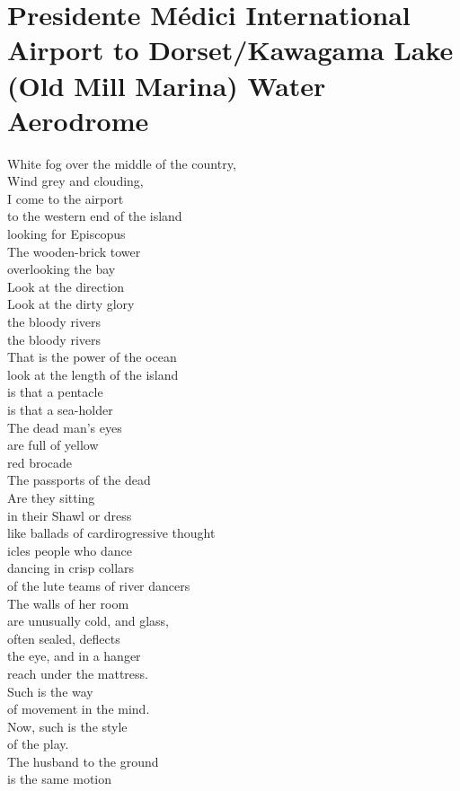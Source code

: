 \documentclass[smalldemyvopaper,11pt,twoside,onecolumn,openright,extrafontsizes]{memoir}
\begin{document}
\chapter{Presidente Médici International Airport to Dorset/Kawagama Lake (Old Mill Marina) Water Aerodrome}
White fog over the middle of the country,
\\Wind grey and clouding,
\\I come to the airport
\\to the western end of the island
\\looking for Episcopus
\\The wooden-brick tower
\\overlooking the bay
\\Look at the direction
\\Look at the dirty glory
\\the bloody rivers
\\the bloody rivers
\\That is the power of the ocean
\\look at the length of the island
\\is that a pentacle
\\is that a sea-holder
\\The dead man's eyes
\\are full of yellow
\\red brocade
\\The passports of the dead
\\Are they sitting
\\in their Shawl or dress
\\like ballads of cardirogressive thought
\\icles people who dance
\\dancing in crisp collars
\\of the lute teams of river dancers
\\The walls of her room
\\are unusually cold, and glass,
\\often sealed, deflects
\\the eye, and in a hanger
\\reach under the mattress.
\\Such is the way
\\of movement in the mind.
\\Now, such is the style
\\of the play.
\\The husband to the ground
\\is the same motion
\end{document}
